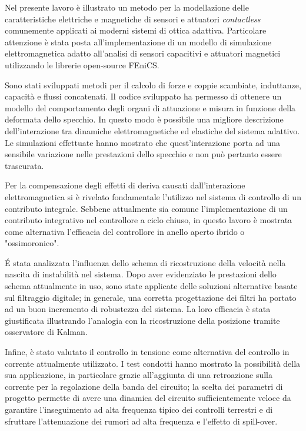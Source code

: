 


\label{chap:Conclusioni}
Nel presente lavoro è illustrato un metodo per la modellazione delle caratteristiche elettriche e magnetiche di sensori e attuatori \textit{contactless} comunemente applicati ai moderni sistemi di ottica adattiva. Particolare attenzione è stata posta all'implementazione di un modello di simulazione elettromagnetica adatto all'analisi di sensori capacitivi e attuatori magnetici utilizzando le librerie open-source FEniCS.

Sono stati sviluppati metodi per il calcolo di forze e coppie scambiate, induttanze, capacità e flussi concatenati. Il codice sviluppato ha permesso di ottenere un modello del comportamento degli organi di attuazione e misura in funzione della deformata dello specchio. In questo modo è possibile una migliore descrizione dell'interazione tra dinamiche elettromagnetiche ed elastiche del sistema adattivo. Le simulazioni effettuate hanno mostrato che quest'interazione porta ad una sensibile variazione nelle prestazioni dello specchio e non può pertanto essere trascurata. 

Per la compensazione degli effetti di deriva  causati dall'interazione elettromagnetica si è rivelato fondamentale l'utilizzo nel sistema di controllo di un contributo integrale. Sebbene attualmente sia comune l'implementazione di un contributo integrativo nel controllore a ciclo chiuso, in questo lavoro è mostrata come alternativa l'efficacia del controllore in anello aperto ibrido o "ossimoronico". 

\'E stata analizzata l'influenza dello schema di ricostruzione della velocità nella nascita di instabilità nel sistema. Dopo aver evidenziato le prestazioni dello schema attualmente in uso, sono state applicate delle soluzioni alternative basate sul filtraggio digitale; in generale, una corretta progettazione dei filtri ha portato ad un buon incremento di robustezza del sistema. La loro efficacia è stata giustificata illustrando l'analogia con la ricostruzione della posizione tramite osservatore di Kalman. 

Infine, è stato valutato il controllo in tensione come alternativa del controllo in corrente attualmente utilizzato. I test condotti hanno mostrato la possibilità della sua applicazione, in particolare grazie all'aggiunta di una retroazione sulla corrente per la regolazione della banda del circuito; la scelta dei parametri di progetto permette di avere una dinamica del circuito sufficientemente veloce da garantire l'inseguimento ad alta frequenza tipico dei controlli terrestri e di sfruttare l'attenuazione dei rumori ad alta frequenza e l'effetto di spill-over.

